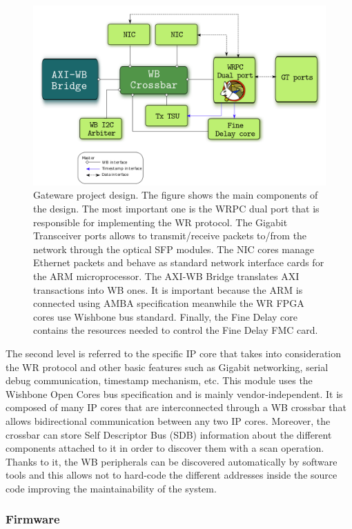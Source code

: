 \begin{figure}[H]
	\centering
	\includegraphics[scale=0.4]{img/gateware_first_level}
	\caption{Gateware project design. The figure shows the main components of the design. The most important one is the WRPC dual port that is responsible for implementing the WR protocol. The Gigabit Transceiver ports allows to transmit/receive packets to/from the network through the optical SFP modules. The NIC cores manage Ethernet packets and behave as standard network interface cards for the ARM microprocessor. The AXI-WB Bridge translates AXI transactions into WB ones. It is important because the ARM is connected using AMBA specification meanwhile the WR FPGA cores use Wishbone bus standard. Finally, the Fine Delay core contains the resources needed to control the Fine Delay FMC card.}
	\label{fig:gateware_first_level}
\end{figure}

The second level is referred to the specific IP core that takes into 
consideration the WR protocol and other basic features such as Gigabit 
networking, serial debug communication, timestamp mechanism, etc. This module 
uses the Wishbone Open Cores bus specification and is mainly 
vendor-independent. It is composed of many IP cores that are interconnected 
through a WB crossbar that allows bidirectional communication between any two 
IP cores. Moreover, the crossbar can store Self Descriptor Bus (SDB) 
information about the different components attached to it in order to discover 
them with a scan operation. Thanks to it, the WB peripherals can be discovered 
automatically by software tools and this allows not to hard-code the different 
addresses inside the source code improving the maintainability of the system. 

\subsubsection{Firmware}

